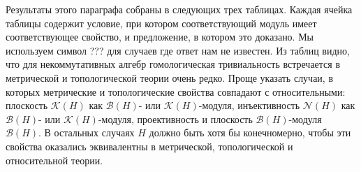 Результаты этого параграфа собраны в следующих трех таблицах. Каждая ячейка
таблицы содержит условие, при котором соответствующий модуль имеет
соответствующее свойство, и предложение, в котором это доказано. Мы используем
символ ??? для случаев где ответ нам не известен.  %
Из таблиц видно, что для
некоммутативных алгебр гомологическая тривиальность встречается в метрической и
топологической теории очень редко. Проще указать случаи, в которых метрические и
топологические свойства совпадают с относительными: плоскость $\mathcal{K}(H)$
как $\mathcal{B}(H)$- или $\mathcal{K}(H)$-модуля, инъективность
$\mathcal{N}(H)$ как $\mathcal{B}(H)$- или $\mathcal{K}(H)$-модуля,
проективность и плоскость $\mathcal{B}(H)$-модуля $\mathcal{B}(H)$. В остальных
случаях $H$ должно быть хотя бы конечномерно, чтобы эти свойства оказались
эквивалентны в метрической, топологической и относительной теории.

